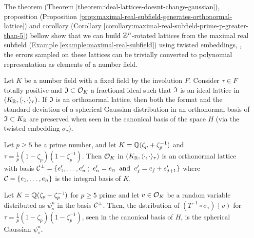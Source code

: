 \documentclass[a4paper,12pt]{article}
\begin{document}
\begin{text}
  The theorem (Theorem \ref{theorem:ideal-lattices-doesnt-change-gaussian}),
  proposition
  (Proposition \ref{prop:maximal-real-subfield-generates-orthonormal-lattice})
  and corollary (Corollary \ref{corollary:maximal-real-subfield-prime-p-greater-than-5}) bellow show that we can build $\mathbb{Z}^n$-rotated
  lattices from the maximal real subfield
  (Example \ref{example:maximal-real-subfield}) using twisted embeddings, \ie, the
  errors sampled on these lattices can be trivially converted to polynomial
  representation as elements of a number field.
\end{text}

\begin{theorem}\label{theorem:ideal-lattices-doesnt-change-gaussian}
  Let $K$ be a number field with a fixed field by the involution $F$. Consider $\tau
  \in F$ totally positive and $\mathfrak{I} \subset \mathcal{O}_K$ a fractional ideal such that $\mathfrak{I}$ is an
  ideal lattice in $(K_{\mathbb{R}} , \langle \cdot,\cdot \rangle_\tau )$. If $\mathfrak{I}$ is an orthonormal lattice, then both the format and the standard deviation of a spherical Gaussian distribution in an orthonormal basis of $\mathfrak{I} \subset K_{\mathbb{R}}$ are preserved when seen in the canonical basis of the space $H$ (via the twisted embedding $\sigma_\tau$).
\end{theorem}

\begin{proposition}\label{prop:maximal-real-subfield-generates-orthonormal-lattice}
Let $p \geq 5$ be a prime number, and let $K = \mathbb{Q}(\zeta_{p} + \zeta_{p} ^{-1})$ and $\tau =
  \frac{1}{p}(1 - \zeta_p)( 1 - \zeta^{- 1}_p)$. Then $\mathcal{O}_K$ in $(K_{\mathbb{R}},\langle{\cdot,\cdot}\rangle_\tau)$ is an
  orthonormal lattice with basis $\mathcal{C}^\perp = \{e_1^\prime, \dots, e^\prime_n \;;\; e^\prime_n = e_n
  \;\; \text{and} \;\; e^\prime_j = e_j +  e^\prime_{j+ 1} \}$ where $\mathcal{C} = \{e_1,\dots,e_n\}$
  is the integral basis of $K$.
\end{proposition}

\begin{corollary}\label{corollary:maximal-real-subfield-prime-p-greater-than-5}
  Let $K = \mathbb{Q}(\zeta_{p} + \zeta_{p} ^{-1})$ for $p \geq 5$ prime and let $v \in \mathcal{O}_K$ be a random variable
  distributed as $\psi_s^n$ in the basis $\mathcal{C}^\perp$. Then, the dstribution of $(T^{-1}
  \circ \sigma_\tau)(v)$ for $\tau = \frac{1}{p}(1 - \zeta_p)( 1 - \zeta^{- 1}_p)$, seen in the
  canonical basis of $H$, is the spherical Gaussian $\psi_s^n$.
\end{corollary}
\end{document}
